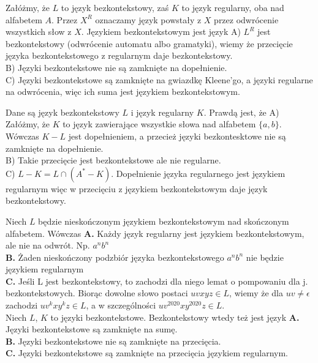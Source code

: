 \begin{solutions}
    \sol Załóżmy, że $L$ to język bezkontekstowy, zaś $K$ to język regularny, oba nad alfabetem $A$. Przez $X^R$ oznaczamy język powstały z $X$ przez odwrócenie wszystkich słow z $X$. Językiem bezkontekstowym jest język
    A) $L^R$ jest bezkontekstowy (odwrócenie automatu albo gramatyki), wiemy że przecięcie języka bezkontekstowego z regularnym daje bezkontekstowy.\\
    B) Języki bezkontekstowe nie są zamknięte na dopełnienie.\\
    C) Języki bezkontekstowe są zamknięte na gwiazdkę Kleene'go, a języki regularne na odwrócenia, więc ich suma jest językiem bezkontekstowym.

    \sol Dane są język bezkontekstowy $L$ i język regularny $K$. Prawdą jest, że
    A) Załóżmy, że $K$ to język zawierające wszystkie słowa nad alfabetem $\{a,b\}$. Wówczas $K-L$ jest dopełnieniem, a przecież języki bezkontesktowe nie są zamknięte na dopełnienie.\\
    B) Takie przecięcie jest bezkontekstowe ale nie regularne.\\
    C) $L-K = L \cap (A^*-K)$. Dopełnienie języka regularnego jest językiem regularnym więc w przecięciu z językiem bezkontekstowym daje język bezkontekstowy.

    \sol Niech $L$ będzie nieskończonym językiem bezkontekstowym nad skończonym alfabetem. Wówczas
    \textbf{A.} Każdy język regularny jest językiem bezkontekstowym, ale nie na odwrót. Np. $ a^n b^n $ \\ 
    \textbf{B.}  Żaden nieskończony podzbiór języka bezkontekstowego $ a^n b^n $ nie będzie językiem regularnym \\ 
    \textbf{C.} Jeśli L jest bezkontekstowy, to zachodzi dla niego lemat o pompowaniu dla j. bezkontekstowych. Biorąc dowolne słowo postaci $uvxyz \in L$,  wiemy że dla $uv \ne \epsilon $  zachodzi $uv^{k}xy^{k}z \in L$, a w szczególności $uv^{2020}xy^{2020}z \in L$. \\
    
    \sol Niech $L$, $K$ to języki bezkontekstowe. Bezkontekstowy wtedy też jest język
    \textbf{A.} Języki bezkontekstowe są zamknięte na sumę. \\ 
    \textbf{B.} Języki bezkontekstowe nie są zamknięte na przecięcia. \\ 
    \textbf{C.} Języki bezkontekstowe są zamknięte na przecięcia językiem regularnym. \\
    



\end{solutions}
